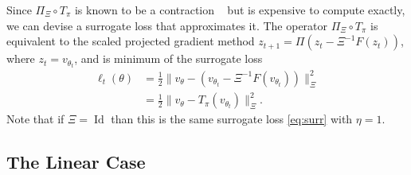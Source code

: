 \documentclass{article} %
\theoremstyle{definition}
\newcommand{\id}{\operatorname{Id}}
\begin{document}
Since $\Pi_{\Xi} \circ T_{\pi}$ is known to be a contraction ~\citep{bertsekas2012dynamic} but is expensive to compute exactly, we can devise a surrogate loss that approximates it. 
The operator $\Pi_{\Xi} \circ T_{\pi}$ is equivalent to the scaled projected gradient method $z_{t+1} = \Pi(z_t - \Xi^{-1} F(z_t))$, where $z_t = v_{\theta_t}$, and is minimum of the surrogate loss
\begin{align}
    \ell_t(\theta) &= \frac{1}{2}\|v_{\theta} -\left( v_{\theta_{t}} - \Xi^{-1} F(v_{\theta_t})\right)\|_{\Xi}^2\\ 
    &= \frac{1}{2}\|v_{\theta} - T_{\pi}(v_{\theta_t})\|_{\Xi}^2.
\end{align}
Note that if $\Xi = \id$ than this is the same surrogate loss \eqref{eq:surr} with $\eta=1$.

\subsection{The Linear Case}\label{sec:appendix-linear}
\end{document}
